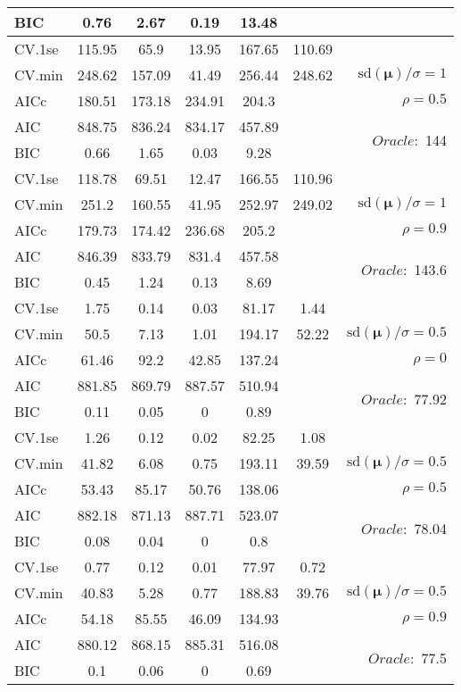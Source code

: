 \begin{table}
\begin{center}
\begin{tabular}{l*{5}{c}|r}
BIC & 0.76 & 2.67 & 0.19 & 13.48 & &  \\
 \hline 
CV.1se & 115.95 & 65.9 & 13.95 & 167.65 & 110.69 & \\
CV.min & 248.62 & 157.09 & 41.49 & 256.44 & 248.62 &  $\mathrm{sd}(\mathbf{\mu})/\sigma=1$ \\
AICc & 180.51 & 173.18 & 234.91 & 204.3 & & $\rho=0.5$ \\
AIC & 848.75 & 836.24 & 834.17 & 457.89 & &  \multirow{2}{*}{$Oracle: $ 144} \\
BIC & 0.66 & 1.65 & 0.03 & 9.28 & &  \\
 \hline 
CV.1se & 118.78 & 69.51 & 12.47 & 166.55 & 110.96 & \\
CV.min & 251.2 & 160.55 & 41.95 & 252.97 & 249.02 &  $\mathrm{sd}(\mathbf{\mu})/\sigma=1$ \\
AICc & 179.73 & 174.42 & 236.68 & 205.2 & & $\rho=0.9$ \\
AIC & 846.39 & 833.79 & 831.4 & 457.58 & &  \multirow{2}{*}{$Oracle: $ 143.6} \\
BIC & 0.45 & 1.24 & 0.13 & 8.69 & &  \\
 \hline 
CV.1se & 1.75 & 0.14 & 0.03 & 81.17 & 1.44 & \\
CV.min & 50.5 & 7.13 & 1.01 & 194.17 & 52.22 &  $\mathrm{sd}(\mathbf{\mu})/\sigma=0.5$ \\
AICc & 61.46 & 92.2 & 42.85 & 137.24 & & $\rho=0$ \\
AIC & 881.85 & 869.79 & 887.57 & 510.94 & &  \multirow{2}{*}{$Oracle: $ 77.92} \\
BIC & 0.11 & 0.05 & 0 & 0.89 & &  \\
 \hline 
CV.1se & 1.26 & 0.12 & 0.02 & 82.25 & 1.08 & \\
CV.min & 41.82 & 6.08 & 0.75 & 193.11 & 39.59 &  $\mathrm{sd}(\mathbf{\mu})/\sigma=0.5$ \\
AICc & 53.43 & 85.17 & 50.76 & 138.06 & & $\rho=0.5$ \\
AIC & 882.18 & 871.13 & 887.71 & 523.07 & &  \multirow{2}{*}{$Oracle: $ 78.04} \\
BIC & 0.08 & 0.04 & 0 & 0.8 & &  \\
 \hline 
CV.1se & 0.77 & 0.12 & 0.01 & 77.97 & 0.72 & \\
CV.min & 40.83 & 5.28 & 0.77 & 188.83 & 39.76 &  $\mathrm{sd}(\mathbf{\mu})/\sigma=0.5$ \\
AICc & 54.18 & 85.55 & 46.09 & 134.93 & & $\rho=0.9$ \\
AIC & 880.12 & 868.15 & 885.31 & 516.08 & &  \multirow{2}{*}{$Oracle: $ 77.5} \\
BIC & 0.1 & 0.06 & 0 & 0.69 & &  \\
 \hline 
\end{tabular}
\end{center}
\vspace{-1cm}
\end{table}




